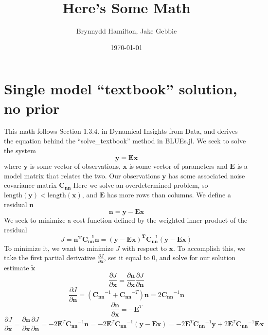 \documentclass{article}
\title{Here's Some Math}
\author{Brynnydd Hamilton, Jake Gebbie}
\date{\today}
\begin{document}
\maketitle
\section{Single model ``textbook'' solution, no prior}
This math follows Section 1.3.4. in Dynamical Insights from Data, and derives the equation behind the ``solve\_textbook'' method in BLUEs.jl. 
We seek to solve the system
\begin{equation}
\label{eq:2}
\mathbf{y = Ex}
\end{equation}
where $\mathbf{y}$ is some vector of observations, $\mathbf{x}$ is some vector of parameters and $\mathbf{E}$ is a model matrix that relates the two. Our observations $\mathbf{y}$ has some associated noise covariance matrix $\mathbf{C_{nn}}$ Here we solve an overdetermined problem, so $\text{length}(\mathbf{y}) < \text{length}(\mathbf{x})$, and $\textbf{E}$ has more rows than columns. We define a residual $\mathbf{n}$
\begin{equation}
\label{eq:3}
\mathbf{n = y - Ex}
\end{equation}
We seek to minimize a cost function defined by the weighted inner product of the residual
\begin{equation}
\label{eq:1}
J = \mathbf{n^TC_{nn}^{-1}n = (y - Ex)^TC_{nn}^{-1}(y-Ex)}
\end{equation}
To minimize it, we want to minimize $J$ with respect to $\mathbf{x}$. To accomplish this, we take the first partial derivative $\frac{\partial J}{\partial \mathbf{x}}$, set it equal to 0, and solve for our solution estimate $\mathbf{\tilde{x}}$
\begin{equation}
\label{eq:4}
\frac{\partial J}{\partial\mathbf{x}} = \frac{\partial \mathbf{n}}{\partial \mathbf{x}}\frac{\partial J}{\partial \mathbf{n}}
\end{equation}
\begin{equation}
\label{eq:5}
\frac{\partial J}{\partial \mathbf{n}} = (\mathbf{C_{nn}}^{-1} + \mathbf{C_{nn}}^{-T})\mathbf{n} = 2 \mathbf{C_{nn}}^{-1} \mathbf{n}
\end{equation}
\begin{equation}
\label{eq:6}
\frac{\partial \mathbf{n}}{\partial \mathbf{x}} = -\mathbf{E}^{T}
\end{equation}
\begin{equation}
\label{eq:7}
\frac{\partial J}{\partial\mathbf{x}} = \frac{\partial \mathbf{n}}{\partial \mathbf{x}}\frac{\partial J}{\partial \mathbf{n}} = -2 \mathbf{E}^T \mathbf{C_{nn}}^{-1} \mathbf{n} = -2 \mathbf{E}^T \mathbf{C_{nn}}^{-1} (\mathbf{y} - \mathbf{Ex}) = -2 \mathbf{E}^T\mathbf{C_{nn}}^{-1}\mathbf{y} + 2 \mathbf{E}^T\mathbf{C_{nn}}^{-1}\mathbf{Ex}
\end{equation}
\end{document}

